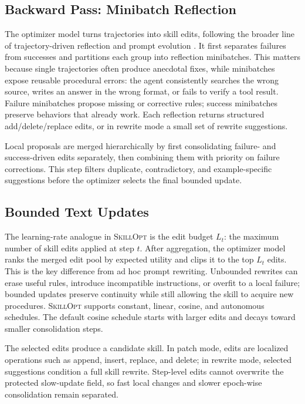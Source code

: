\documentclass{llmxive}
\providecommand{\ourmethod}{\textsc{SkillOpt}\xspace}
\begin{document}
\subsection{Backward Pass: Minibatch Reflection}
\label{sec:method_backward}

The optimizer model turns trajectories into skill edits, following the broader line of trajectory-driven reflection and prompt evolution \citep{shinn2023reflexion,madaan2023selfrefine,agrawal2025gepa}. It first separates failures from successes and partitions each group into reflection minibatches. This matters because single trajectories often produce anecdotal fixes, while minibatches expose reusable procedural errors: the agent consistently searches the wrong source, writes an answer in the wrong format, or fails to verify a tool result. Failure minibatches propose missing or corrective rules; success minibatches preserve behaviors that already work. Each reflection returns structured add/delete/replace edits, or in rewrite mode a small set of rewrite suggestions.

Local proposals are merged hierarchically by first consolidating failure- and success-driven edits separately, then combining them with priority on failure corrections. This step filters duplicate, contradictory, and example-specific suggestions before the optimizer selects the final bounded update.

\subsection{Bounded Text Updates}
\label{sec:method_controls}

The learning-rate analogue in \ourmethod{} is the edit budget $L_t$: the maximum number of skill edits applied at step $t$. After aggregation, the optimizer model ranks the merged edit pool by expected utility and clips it to the top $L_t$ edits. This is the key difference from ad hoc prompt rewriting. Unbounded rewrites can erase useful rules, introduce incompatible instructions, or overfit to a local failure; bounded updates preserve continuity while still allowing the skill to acquire new procedures. \ourmethod{} supports constant, linear, cosine, and autonomous schedules. The default cosine schedule starts with larger edits and decays toward smaller consolidation steps.

The selected edits produce a candidate skill. In patch mode, edits are localized operations such as append, insert, replace, and delete; in rewrite mode, selected suggestions condition a full skill rewrite. Step-level edits cannot overwrite the protected slow-update field, so fast local changes and slower epoch-wise consolidation remain separated.
\end{document}
